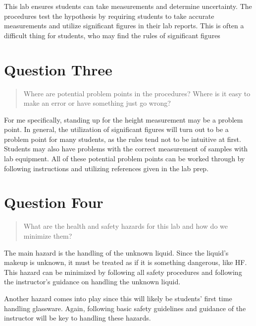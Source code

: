 \documentclass[11pt, letterpaper]{article}
\begin{document}
This lab ensures students can take measurements and determine uncertainty.
The procedures test the hypothesis by requiring students to take accurate measurements and utilize
significant figures in their lab reports.
This is often a difficult thing for students, who may find the rules of significant figures 



\section{Question Three}
\begin{quote}
    Where are potential problem points in the procedures? Where is it easy to make an error 
    or have something just go wrong?
\end{quote}

For me specifically, standing up for the height measurement may be a problem point.
In general, the utilization of significant figures will turn out to be a problem point for many
students, as the rules tend not to be intuitive at first.
Students may also have problems with the correct measurement of samples with lab equipment.
All of these potential problem points can be worked through by following instructions and
utilizing references given in the lab prep.





\section{Question Four}
\begin{quote}
    What are the health and safety hazards for this lab and how do we minimize them?
\end{quote}

The main hazard is the handling of the unknown liquid. 
Since the liquid's makeup is unknown, it must be treated as if it is something dangerous,
like HF.
This hazard can be minimized by following all safety procedures and following the instructor's
guidance on handling the unknown liquid.

Another hazard comes into play since this will likely be students' first time handling glassware.
Again, following basic safety guidelines and guidance of the instructor will be key to handling
these hazards.
\end{document}
